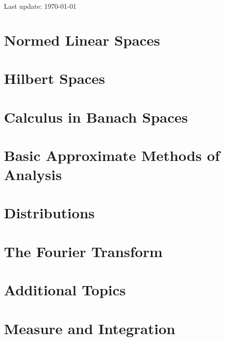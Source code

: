 \documentclass[11pt,oneside,openany]{memoir}
\begin{document}
    \begin{abstract}
        \lipsum[1]
    \end{abstract}
    
    \listofkeytheorems[
        ignoreall, 
        show=problem,
        title=List of Problems
    ]
    \vfill
    \specialdate
    Last update: \today

    \chapter{Normed Linear Spaces}
        
        
        
        
        
        
    \chapter{Hilbert Spaces}
    \chapter{Calculus in Banach Spaces}
    \chapter{Basic Approximate Methods of Analysis}
    \chapter{Distributions}
    \chapter{The Fourier Transform}
    \chapter{Additional Topics}
    \chapter{Measure and Integration}
\end{document}
